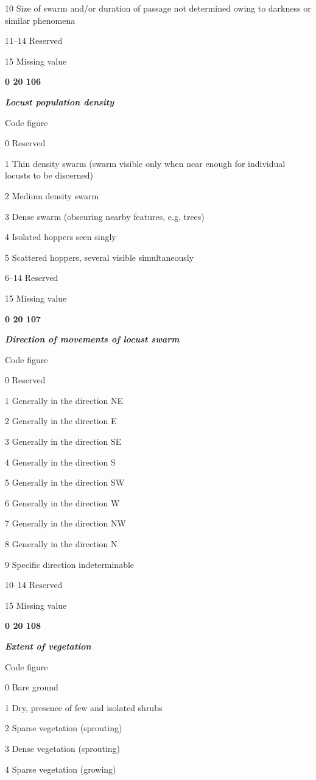 10 Size of swarm and/or duration of passage not determined owing to darkness or similar phenomena

11--14 Reserved

15 Missing value

\textbf{0 20 106}

\emph{\textbf{Locust population density}}

Code figure

0 Reserved

1 Thin density swarm (swarm visible only when near enough for individual locusts to be discerned)

2 Medium density swarm

3 Dense swarm (obscuring nearby features, e.g. trees)

4 Isolated hoppers seen singly

5 Scattered hoppers, several visible simultaneously

6--14 Reserved

15 Missing value

\textbf{0 20 107}

\emph{\textbf{Direction of movements of locust swarm}}

Code figure

0 Reserved

1 Generally in the direction NE

2 Generally in the direction E

3 Generally in the direction SE

4 Generally in the direction S

5 Generally in the direction SW

6 Generally in the direction W

7 Generally in the direction NW

8 Generally in the direction N

9 Specific direction indeterminable

10--14 Reserved

15 Missing value

\textbf{0 20 108}

\emph{\textbf{Extent of vegetation}}

Code figure

0 Bare ground

1 Dry, presence of few and isolated shrubs

2 Sparse vegetation (sprouting)

3 Dense vegetation (sprouting)

4 Sparse vegetation (growing)


